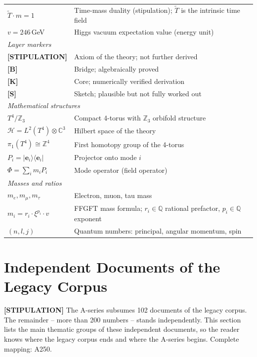 {\begin{longtable}{@{}p{2.6cm}p{\dimexpr\textwidth-2.8cm\relax}@{}}
$\tilde T\cdot m = 1$ & Time-mass duality (stipulation); $\tilde T$ is the
  intrinsic time field \\
$v = 246\,$GeV & Higgs vacuum expectation value (energy unit) \\
\midrule
\multicolumn{2}{l}{\textit{Layer markers}} \\
\textbf{[STIPULATION]} & Axiom of the theory; not further derived \\
\textbf{[B]} & Bridge; algebraically proved \\
\textbf{[K]} & Core; numerically verified derivation \\
\textbf{[S]} & Sketch; plausible but not fully worked out \\
\midrule
\multicolumn{2}{l}{\textit{Mathematical structures}} \\
$T^4/\mathbb{Z}_3$ & Compact 4-torus with $\mathbb{Z}_3$ orbifold structure \\
$\mathcal{H} = L^2(T^4)\otimes\mathbb{C}^3$ & Hilbert space of the theory \\
$\pi_1(T^4)\cong\mathbb{Z}^4$ & First homotopy group of the 4-torus \\
$P_i = |\mathbf{e}_i\rangle\langle\mathbf{e}_i|$ & Projector onto mode $i$ \\
$\Phi = \sum_i m_i P_i$ & Mode operator (field operator) \\
\midrule
\multicolumn{2}{l}{\textit{Masses and ratios}} \\
$m_e, m_\mu, m_\tau$ & Electron, muon, tau mass \\
$m_i = r_i\cdot\xi^{p_i}\cdot v$ & FFGFT mass formula; $r_i\in\mathbb{Q}$
  rational prefactor, $p_i\in\mathbb{Q}$ exponent \\
$(n, l, j)$ & Quantum numbers: principal, angular momentum, spin \\
\end{longtable}
}
\renewcommand{\arraystretch}{1.0}

\section{Independent Documents of the Legacy Corpus}

\textbf{[STIPULATION]} The A-series subsumes 102 documents of the legacy corpus.
The remainder -- more than 200 numbers -- stands independently. This section lists
the main thematic groups of these independent documents, so the reader knows where
the legacy corpus ends and where the A-series begins. Complete mapping: A250.

